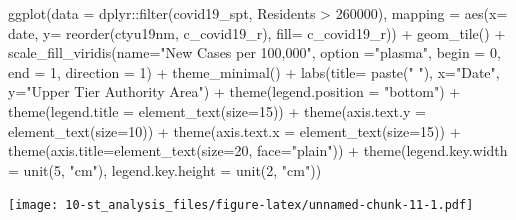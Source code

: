 \documentclass[
]{book}
\newenvironment{Shaded}{\begin{snugshade}}{\end{snugshade}}
\newcommand{\AttributeTok}[1]{\textcolor[rgb]{0.77,0.63,0.00}{#1}}
\newcommand{\DecValTok}[1]{\textcolor[rgb]{0.00,0.00,0.81}{#1}}
\newcommand{\FunctionTok}[1]{\textcolor[rgb]{0.00,0.00,0.00}{#1}}
\newcommand{\NormalTok}[1]{#1}
\newcommand{\SpecialCharTok}[1]{\textcolor[rgb]{0.00,0.00,0.00}{#1}}
\newcommand{\StringTok}[1]{\textcolor[rgb]{0.31,0.60,0.02}{#1}}
\begin{document}
\begin{Shaded}
\begin{Highlighting}[]
\FunctionTok{ggplot}\NormalTok{(}\AttributeTok{data =}\NormalTok{ dplyr}\SpecialCharTok{::}\FunctionTok{filter}\NormalTok{(covid19\_spt, Residents }\SpecialCharTok{\textgreater{}} \DecValTok{260000}\NormalTok{), }
           \AttributeTok{mapping =} \FunctionTok{aes}\NormalTok{(}\AttributeTok{x=}\NormalTok{ date, }\AttributeTok{y=} \FunctionTok{reorder}\NormalTok{(ctyu19nm, c\_covid19\_r), }\AttributeTok{fill=}\NormalTok{ c\_covid19\_r)) }\SpecialCharTok{+}
  \FunctionTok{geom\_tile}\NormalTok{() }\SpecialCharTok{+}
  \FunctionTok{scale\_fill\_viridis}\NormalTok{(}\AttributeTok{name=}\StringTok{"New Cases per 100,000"}\NormalTok{, }\AttributeTok{option =}\StringTok{"plasma"}\NormalTok{, }\AttributeTok{begin =} \DecValTok{0}\NormalTok{, }\AttributeTok{end =} \DecValTok{1}\NormalTok{, }\AttributeTok{direction =} \DecValTok{1}\NormalTok{) }\SpecialCharTok{+}
  \FunctionTok{theme\_minimal}\NormalTok{() }\SpecialCharTok{+} 
  \FunctionTok{labs}\NormalTok{(}\AttributeTok{title=} \FunctionTok{paste}\NormalTok{(}\StringTok{" "}\NormalTok{), }\AttributeTok{x=}\StringTok{"Date"}\NormalTok{, }\AttributeTok{y=}\StringTok{"Upper Tier Authority Area"}\NormalTok{) }\SpecialCharTok{+}
  \FunctionTok{theme}\NormalTok{(}\AttributeTok{legend.position =} \StringTok{"bottom"}\NormalTok{) }\SpecialCharTok{+}
  \FunctionTok{theme}\NormalTok{(}\AttributeTok{legend.title =} \FunctionTok{element\_text}\NormalTok{(}\AttributeTok{size=}\DecValTok{15}\NormalTok{)) }\SpecialCharTok{+}
  \FunctionTok{theme}\NormalTok{(}\AttributeTok{axis.text.y =} \FunctionTok{element\_text}\NormalTok{(}\AttributeTok{size=}\DecValTok{10}\NormalTok{)) }\SpecialCharTok{+}
  \FunctionTok{theme}\NormalTok{(}\AttributeTok{axis.text.x =} \FunctionTok{element\_text}\NormalTok{(}\AttributeTok{size=}\DecValTok{15}\NormalTok{)) }\SpecialCharTok{+}
  \FunctionTok{theme}\NormalTok{(}\AttributeTok{axis.title=}\FunctionTok{element\_text}\NormalTok{(}\AttributeTok{size=}\DecValTok{20}\NormalTok{, }\AttributeTok{face=}\StringTok{"plain"}\NormalTok{)) }\SpecialCharTok{+}
  \FunctionTok{theme}\NormalTok{(}\AttributeTok{legend.key.width =} \FunctionTok{unit}\NormalTok{(}\DecValTok{5}\NormalTok{, }\StringTok{"cm"}\NormalTok{), }\AttributeTok{legend.key.height =} \FunctionTok{unit}\NormalTok{(}\DecValTok{2}\NormalTok{, }\StringTok{"cm"}\NormalTok{))}
\end{Highlighting}
\end{Shaded}

\texttt{[image: 10-st\_analysis\_files/figure-latex/unnamed-chunk-11-1.pdf]}
\end{document}
